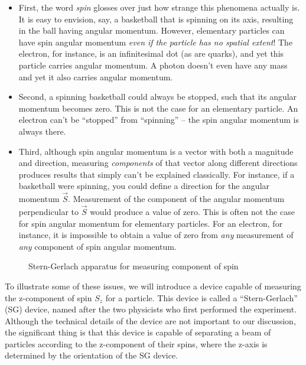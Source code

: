 \begin{itemize}

\item First, the word {\it spin} glosses over just how strange this
phenomena actually is.  It is easy to envision, say, a basketball that
is spinning on its axis, resulting in the ball having angular
momentum.  However, elementary particles can have spin angular
momentum {\it even if the particle has no spatial extent}!  The
electron, for instance, is an infinitesimal dot (as are quarks), and
yet this particle carries angular momentum.  A photon doesn't even
have any mass and yet it also carries angular momentum.

\item Second, a spinning basketball could always be stopped, such
that its angular momentum becomes zero.  This is not the case for
an elementary particle.  An electron can't be ``stopped'' from
``spinning'' -- the spin angular momentum is always there.

\item Third, although spin angular momentum is a vector with both
a magnitude and direction, measuring {\it components\/} of that
vector along different directions produces results that simply
can't be explained classically.  For instance, if a basketball were
spinning, you could define a direction for the angular momentum
$\vec{S}$. Measurement of the component of the angular
momentum perpendicular to $\vec{S}$ would produce a
value of zero.  This is often not the case for spin angular
momentum for elementary particles.  For an electron, for instance,
it is impossible to obtain a value of zero from {\it any\/}
measurement of {\it any\/} component of spin angular momentum.

\end{itemize}

\begin{figure}[h]
\begin{center}
\caption{Stern-Gerlach apparatus for measuring component of spin}
\label{fig:SGDevice}
\end{center}
\end{figure}

To illustrate some of these issues, we will introduce a device capable of measuring the z-component of spin $S_z$ for a particle.  This device is called a ``Stern-Gerlach'' (SG) device, named after the two physicists who first performed the experiment.  Although the technical details of the device are not important to our discussion, the significant thing is that this device is capable of separating a beam of particles according to the z-component of their spins, where the z-axis is determined by the orientation of the SG device.

